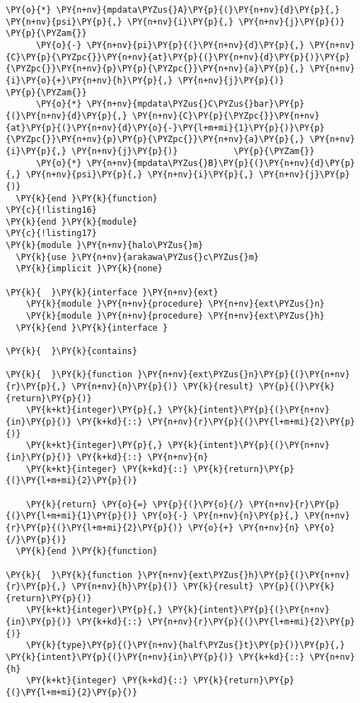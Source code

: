 \begin{Verbatim}[commandchars=\\\{\}]
      \PY{o}{*} \PY{n+nv}{mpdata\PYZus{}A}\PY{p}{(}\PY{n+nv}{d}\PY{p}{,} \PY{n+nv}{psi}\PY{p}{,} \PY{n+nv}{i}\PY{p}{,} \PY{n+nv}{j}\PY{p}{)}                         \PY{p}{\PYZam{}}
      \PY{o}{-} \PY{n+nv}{pi}\PY{p}{(}\PY{n+nv}{d}\PY{p}{,} \PY{n+nv}{C}\PY{p}{\PYZpc{}}\PY{n+nv}{at}\PY{p}{(}\PY{n+nv}{d}\PY{p}{)}\PY{p}{\PYZpc{}}\PY{n+nv}{p}\PY{p}{\PYZpc{}}\PY{n+nv}{a}\PY{p}{,} \PY{n+nv}{i}\PY{o}{+}\PY{n+nv}{h}\PY{p}{,} \PY{n+nv}{j}\PY{p}{)}                     \PY{p}{\PYZam{}}
      \PY{o}{*} \PY{n+nv}{mpdata\PYZus{}C\PYZus{}bar}\PY{p}{(}\PY{n+nv}{d}\PY{p}{,} \PY{n+nv}{C}\PY{p}{\PYZpc{}}\PY{n+nv}{at}\PY{p}{(}\PY{n+nv}{d}\PY{o}{-}\PY{l+m+mi}{1}\PY{p}{)}\PY{p}{\PYZpc{}}\PY{n+nv}{p}\PY{p}{\PYZpc{}}\PY{n+nv}{a}\PY{p}{,} \PY{n+nv}{i}\PY{p}{,} \PY{n+nv}{j}\PY{p}{)}           \PY{p}{\PYZam{}}
      \PY{o}{*} \PY{n+nv}{mpdata\PYZus{}B}\PY{p}{(}\PY{n+nv}{d}\PY{p}{,} \PY{n+nv}{psi}\PY{p}{,} \PY{n+nv}{i}\PY{p}{,} \PY{n+nv}{j}\PY{p}{)}
  \PY{k}{end }\PY{k}{function}
\PY{c}{!listing16}
\PY{k}{end }\PY{k}{module}
\PY{c}{!listing17}
\PY{k}{module }\PY{n+nv}{halo\PYZus{}m}
  \PY{k}{use }\PY{n+nv}{arakawa\PYZus{}c\PYZus{}m}
  \PY{k}{implicit }\PY{k}{none}

\PY{k}{  }\PY{k}{interface }\PY{n+nv}{ext}
    \PY{k}{module }\PY{n+nv}{procedure} \PY{n+nv}{ext\PYZus{}n}
    \PY{k}{module }\PY{n+nv}{procedure} \PY{n+nv}{ext\PYZus{}h}
  \PY{k}{end }\PY{k}{interface }

\PY{k}{  }\PY{k}{contains}

\PY{k}{  }\PY{k}{function }\PY{n+nv}{ext\PYZus{}n}\PY{p}{(}\PY{n+nv}{r}\PY{p}{,} \PY{n+nv}{n}\PY{p}{)} \PY{k}{result} \PY{p}{(}\PY{k}{return}\PY{p}{)}
    \PY{k+kt}{integer}\PY{p}{,} \PY{k}{intent}\PY{p}{(}\PY{n+nv}{in}\PY{p}{)} \PY{k+kd}{::} \PY{n+nv}{r}\PY{p}{(}\PY{l+m+mi}{2}\PY{p}{)}
    \PY{k+kt}{integer}\PY{p}{,} \PY{k}{intent}\PY{p}{(}\PY{n+nv}{in}\PY{p}{)} \PY{k+kd}{::} \PY{n+nv}{n}
    \PY{k+kt}{integer} \PY{k+kd}{::} \PY{k}{return}\PY{p}{(}\PY{l+m+mi}{2}\PY{p}{)}
    
    \PY{k}{return} \PY{o}{=} \PY{p}{(}\PY{o}{/} \PY{n+nv}{r}\PY{p}{(}\PY{l+m+mi}{1}\PY{p}{)} \PY{o}{-} \PY{n+nv}{n}\PY{p}{,} \PY{n+nv}{r}\PY{p}{(}\PY{l+m+mi}{2}\PY{p}{)} \PY{o}{+} \PY{n+nv}{n} \PY{o}{/}\PY{p}{)}
  \PY{k}{end }\PY{k}{function}

\PY{k}{  }\PY{k}{function }\PY{n+nv}{ext\PYZus{}h}\PY{p}{(}\PY{n+nv}{r}\PY{p}{,} \PY{n+nv}{h}\PY{p}{)} \PY{k}{result} \PY{p}{(}\PY{k}{return}\PY{p}{)}
    \PY{k+kt}{integer}\PY{p}{,} \PY{k}{intent}\PY{p}{(}\PY{n+nv}{in}\PY{p}{)} \PY{k+kd}{::} \PY{n+nv}{r}\PY{p}{(}\PY{l+m+mi}{2}\PY{p}{)}
    \PY{k}{type}\PY{p}{(}\PY{n+nv}{half\PYZus{}t}\PY{p}{)}\PY{p}{,} \PY{k}{intent}\PY{p}{(}\PY{n+nv}{in}\PY{p}{)} \PY{k+kd}{::} \PY{n+nv}{h}
    \PY{k+kt}{integer} \PY{k+kd}{::} \PY{k}{return}\PY{p}{(}\PY{l+m+mi}{2}\PY{p}{)}
    

\end{Verbatim}
